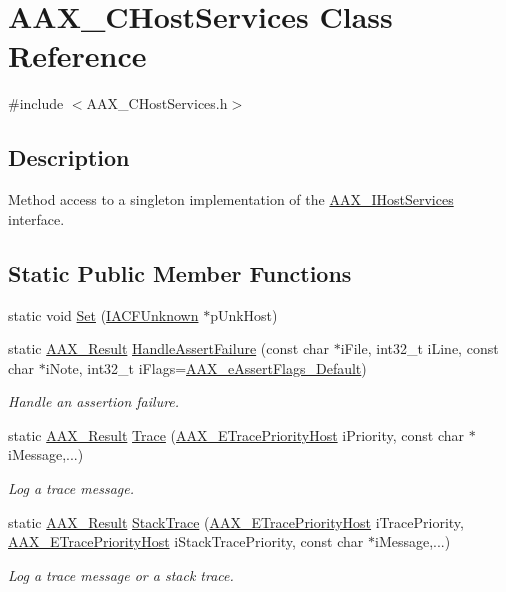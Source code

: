 \hypertarget{a01489}{}\section{A\+A\+X\+\_\+\+C\+Host\+Services Class Reference}
\label{a01489}


{\ttfamily \#include $<$A\+A\+X\+\_\+\+C\+Host\+Services.\+h$>$}



\subsection{Description}
Method access to a singleton implementation of the \mbox{\hyperlink{a01841}{A\+A\+X\+\_\+\+I\+Host\+Services}} interface. \subsection*{Static Public Member Functions}
\begin{DoxyCompactItemize}
\item 
static void \mbox{\hyperlink{a01489_af927887d03f4f978fb90d8ac3df1f205}{Set}} (\mbox{\hyperlink{a01409}{I\+A\+C\+F\+Unknown}} $\ast$p\+Unk\+Host)
\item 
static \mbox{\hyperlink{a00392_a4d8f69a697df7f70c3a8e9b8ee130d2f}{A\+A\+X\+\_\+\+Result}} \mbox{\hyperlink{a01489_a17f333ba14d681bc84309b8a5632e6a4}{Handle\+Assert\+Failure}} (const char $\ast$i\+File, int32\+\_\+t i\+Line, const char $\ast$i\+Note, int32\+\_\+t i\+Flags=\mbox{\hyperlink{a00491_ab87a565fcd58c3d860d50a210b264985a46c4ae37bd14e71bfd34781038f5f508}{A\+A\+X\+\_\+e\+Assert\+Flags\+\_\+\+Default}})
\begin{DoxyCompactList}\small\item\em Handle an assertion failure. \end{DoxyCompactList}\item 
static \mbox{\hyperlink{a00392_a4d8f69a697df7f70c3a8e9b8ee130d2f}{A\+A\+X\+\_\+\+Result}} \mbox{\hyperlink{a01489_ad724c59469bd8a08fee0816539a08997}{Trace}} (\mbox{\hyperlink{a00491_a2dd667e4dea5781f38832fd9f1725f1b}{A\+A\+X\+\_\+\+E\+Trace\+Priority\+Host}} i\+Priority, const char $\ast$i\+Message,...)
\begin{DoxyCompactList}\small\item\em Log a trace message. \end{DoxyCompactList}\item 
static \mbox{\hyperlink{a00392_a4d8f69a697df7f70c3a8e9b8ee130d2f}{A\+A\+X\+\_\+\+Result}} \mbox{\hyperlink{a01489_a9edeb9a0dfebf147f9e87dee521ec2c7}{Stack\+Trace}} (\mbox{\hyperlink{a00491_a2dd667e4dea5781f38832fd9f1725f1b}{A\+A\+X\+\_\+\+E\+Trace\+Priority\+Host}} i\+Trace\+Priority, \mbox{\hyperlink{a00491_a2dd667e4dea5781f38832fd9f1725f1b}{A\+A\+X\+\_\+\+E\+Trace\+Priority\+Host}} i\+Stack\+Trace\+Priority, const char $\ast$i\+Message,...)
\begin{DoxyCompactList}\small\item\em Log a trace message or a stack trace. \end{DoxyCompactList}\end{DoxyCompactItemize}


